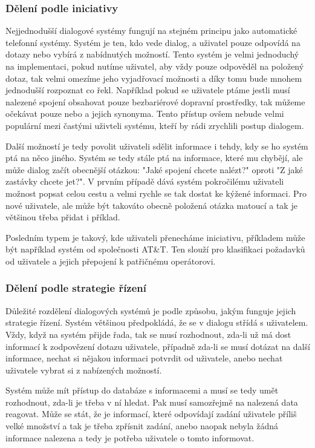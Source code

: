 \subsubsection{Dělení podle iniciativy}

Nejjednodušší dialogové systémy fungují na stejném principu jako automatické
telefonní systémy. Systém je ten, kdo vede dialog, a uživatel pouze odpovídá na
dotazy nebo vybírá z nabídnutých možností. Tento systém je velmi jednoduchý na
implementaci, pokud nutíme uživatel, aby vždy pouze odpověděl na položený
dotaz, tak velmi omezíme jeho vyjadřovací možnosti a díky tomu bude mnohem
jednodušší rozpoznat co řekl. Například pokud se uživatele ptáme jestli musí
nalezené spojení obsahovat pouze bezbariérové dopravní prostředky, tak můžeme
očekávat pouze  nebo  a jejich synonyma. Tento přístup ovšem
nebude velmi populární mezi častými uživteli systému, kteří by rádi zrychlili
postup dialogem.

Další možností je tedy povolit uživateli sdělit informace i tehdy, kdy se ho
systém ptá na něco jiného. Systém se tedy stále ptá na informace, které mu
chybějí, ale může dialog začít obecnější otázkou: "Jaké spojení chcete nalézt?"
oproti "Z jaké zastávky chcete jet?". V prvním případě dává systém pokročilému
uživateli možnost popsat celou cestu a velmi rychle se tak dostat ke kýžené
informaci. Pro nové uživatele, ale může být takováto obecně položená otázka
matoucí a tak je většinou třeba přidat i příklad.

Posledním typem je takový, kde uživateli přenecháme iniciativu, příkladem může
být například systém  \cite{gorin1997may} od
společnosti AT\&T. Ten slouží pro klasifikaci požadavků od uživatele a jejich
přepojení k patřičnému operátorovi.

\subsubsection{Dělení podle strategie řízení}

Důležité rozdělení dialogových systémů je podle způsobu, jakým funguje jejich
strategie řízení. Systém většinou předpokládá, že se v dialogu střídá s
uživatelem. Vždy, když na systém přijde řada, tak se musí rozhodnout, zda-li už
má dost informací k zodpovězení dotazu uživatele, případně zda-li se musí
dotázat na další informace, nechat si nějakou informaci potvrdit od uživatele,
anebo nechat uživatele vybrat si z nabízených možností.

Systém může mít přístup do databáze s informacemi a musí se tedy umět
rozhodnout, zda-li je třeba v ní hledat. Pak musí samozřejmě na nalezená data
reagovat. Může se stát, že je informací, které odpovídají zadání uživatele
příliš velké množství a tak je třeba zpřísnit zadání, anebo naopak nebyla žádná
informace nalezena a tedy je potřeba uživatele o tomto informovat.

